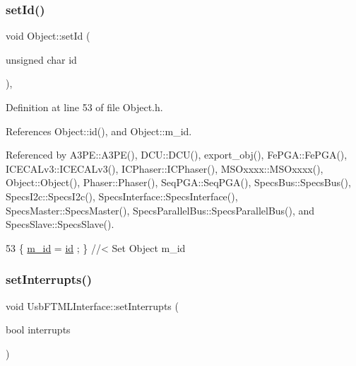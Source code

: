 \subsubsection{\texorpdfstring{set\+Id()}{setId()}}
{\footnotesize\ttfamily void Object\+::set\+Id (\begin{DoxyParamCaption}\item[{unsigned char}]{id }\end{DoxyParamCaption})\hspace{0.3cm}{\ttfamily [inline]}, {\ttfamily [inherited]}}



Definition at line 53 of file Object.\+h.



References Object\+::id(), and Object\+::m\+\_\+id.



Referenced by A3\+P\+E\+::\+A3\+P\+E(), D\+C\+U\+::\+D\+C\+U(), export\+\_\+obj(), Fe\+P\+G\+A\+::\+Fe\+P\+G\+A(), I\+C\+E\+C\+A\+Lv3\+::\+I\+C\+E\+C\+A\+Lv3(), I\+C\+Phaser\+::\+I\+C\+Phaser(), M\+S\+Oxxxx\+::\+M\+S\+Oxxxx(), Object\+::\+Object(), Phaser\+::\+Phaser(), Seq\+P\+G\+A\+::\+Seq\+P\+G\+A(), Specs\+Bus\+::\+Specs\+Bus(), Specs\+I2c\+::\+Specs\+I2c(), Specs\+Interface\+::\+Specs\+Interface(), Specs\+Master\+::\+Specs\+Master(), Specs\+Parallel\+Bus\+::\+Specs\+Parallel\+Bus(), and Specs\+Slave\+::\+Specs\+Slave().


\begin{DoxyCode}
53 \{ \hyperlink{classObject_aca74b9dbfed7b5556ea2d56c65b6b6b0}{m\_id}    = \hyperlink{classObject_af99145335cc61ff6e2798ea17db009d2}{id}    ; \} \textcolor{comment}{//< Set Object m\_id}
\end{DoxyCode}
\mbox{\label{classUsbFTMLInterface_ac82eb9d63d4279998765dcc8c539bba9}} 
\subsubsection{\texorpdfstring{set\+Interrupts()}{setInterrupts()}}
{\footnotesize\ttfamily void Usb\+F\+T\+M\+L\+Interface\+::set\+Interrupts (\begin{DoxyParamCaption}\item[{bool}]{interrupts }\end{DoxyParamCaption})\hspace{0.3cm}{\ttfamily [inline]}}

